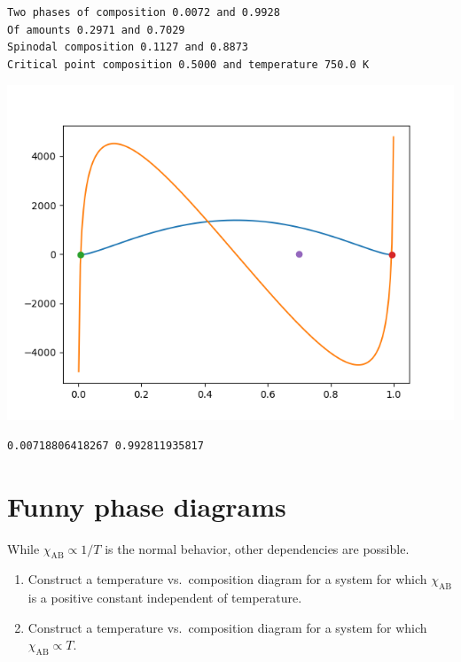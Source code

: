 \documentclass[11pt]{article}
\begin{document}
\begin{verbatim}
Two phases of composition 0.0072 and 0.9928
Of amounts 0.2971 and 0.7029
Spinodal composition 0.1127 and 0.8873
Critical point composition 0.5000 and temperature 750.0 K
\end{verbatim}

\begin{center}
\includegraphics[width=.9\linewidth]{./mixture.png}
\end{center}

\begin{verbatim}
0.00718806418267 0.992811935817
\end{verbatim}

\section{Funny phase diagrams}
\label{sec:org3f854a7}
While \(\chi_\text{AB} \propto 1/T\) is the normal behavior, other dependencies are possible.

\begin{enumerate}
\item Construct a temperature vs.~composition diagram for a system for which
\(\chi_\text{AB}\) is a positive constant independent of temperature.

\item Construct a temperature vs.~composition diagram for a system for which
\(\chi_\text{AB} \propto T\).
\end{enumerate}
\end{document}

